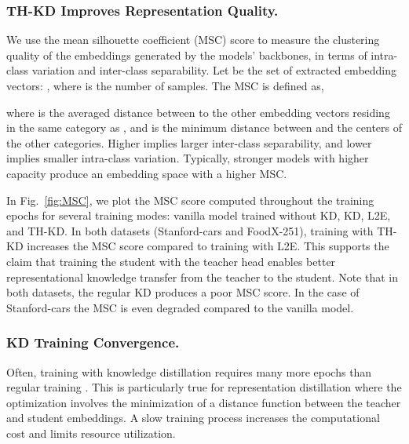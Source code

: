 \vspace{-3mm}
\subsubsection{TH-KD Improves Representation Quality.} 
We use the mean silhouette coefficient (MSC) score \cite{silhouettes} to measure the clustering quality of the embeddings generated by the models' backbones, in terms of intra-class variation and inter-class separability. 
Let  be the set of extracted embedding vectors: , where  is the number of samples. The MSC is defined as,

where  is the averaged distance between  to the other embedding vectors residing in the same category as , and  is the minimum distance between  and the centers of the other categories. Higher  implies larger inter-class separability, and lower  implies smaller intra-class variation. Typically, stronger models with higher capacity produce an embedding space with a higher MSC.

In Fig.~\ref{fig:MSC},  we plot the MSC score computed throughout the training epochs for several training modes: vanilla model trained without KD, KD, L2E, and TH-KD.
In both datasets (Stanford-cars and FoodX-251), training with TH-KD increases the MSC score compared to training with L2E. 
This supports the claim that training the student with the teacher head enables better representational knowledge transfer from the teacher to the student.
Note that in both datasets, the regular KD produces a poor MSC score. In the case of Stanford-cars the MSC is even degraded compared to the vanilla model.

\vspace{-3mm}
\subsubsection{KD Training Convergence.}\label{sec:convergence}
Often, training with knowledge distillation requires many more epochs than regular training \cite{beyer2021knowledge}. This is particularly true for representation distillation where the optimization involves the minimization of a distance function between the teacher and student embeddings. 
A slow training process increases the computational cost and limits resource utilization.   

